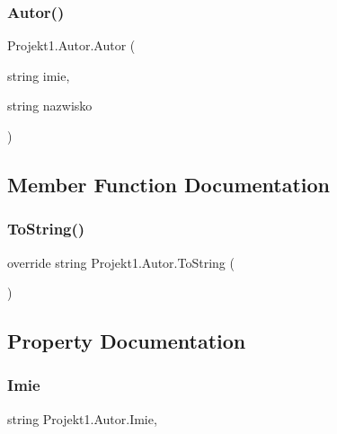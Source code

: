 \subsubsection{\texorpdfstring{Autor()}{Autor()}}
{\footnotesize\ttfamily Projekt1.\+Autor.\+Autor (\begin{DoxyParamCaption}\item[{string}]{imie,  }\item[{string}]{nazwisko }\end{DoxyParamCaption})}



\subsection{Member Function Documentation}
\mbox{\label{class_projekt1_1_1_autor_a3457cce4f59d68c68690555f0976c843}} 
\subsubsection{\texorpdfstring{ToString()}{ToString()}}
{\footnotesize\ttfamily override string Projekt1.\+Autor.\+To\+String (\begin{DoxyParamCaption}{ }\end{DoxyParamCaption})}



\subsection{Property Documentation}
\mbox{\label{class_projekt1_1_1_autor_a029059f6256a8051c736f9a74843c36e}} 
\subsubsection{\texorpdfstring{Imie}{Imie}}
{\footnotesize\ttfamily string Projekt1.\+Autor.\+Imie\hspace{0.3cm}{\ttfamily [get]}, {}}

\mbox{\label{class_projekt1_1_1_autor_a51dfb5d0551e89c9149e32389c592b7c}} 
